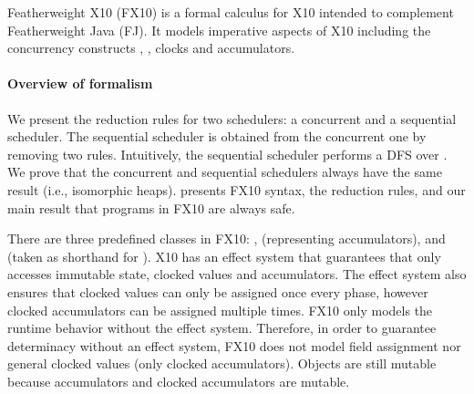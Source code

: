 Featherweight X10 (FX10) is a formal calculus for X10 intended to  complement Featherweight Java
(FJ).  It models imperative aspects of X10 including the concurrency
constructs \hfinish{}, \hasync{}, clocks and accumulators.

\paragraph{Overview of formalism}
We present the reduction rules for two schedulers:
    a concurrent and a sequential scheduler.
The sequential scheduler is obtained from the concurrent one by removing two rules.
Intuitively, the sequential scheduler performs a DFS over .
We prove that the concurrent and sequential schedulers always have the same result (i.e., isomorphic heaps).
 presents FX10 syntax,
     the reduction rules,
    and  our main result that programs in FX10 are always safe.

There are three predefined classes in FX10:
    ,
     (representing accumulators),
    and  (taken as shorthand for ).
X10 has an effect system that guarantees that
    \hasync{} only accesses immutable state, clocked values and accumulators.
The effect system also ensures that clocked values can only be assigned once every phase,
    however clocked accumulators can be assigned multiple times.
FX10 only models the runtime behavior without the effect system.
Therefore, in order to guarantee determinacy without an effect system,
    FX10 does not model field assignment nor general clocked values (only clocked accumulators).
Objects are still mutable because accumulators and clocked accumulators
    are mutable.

